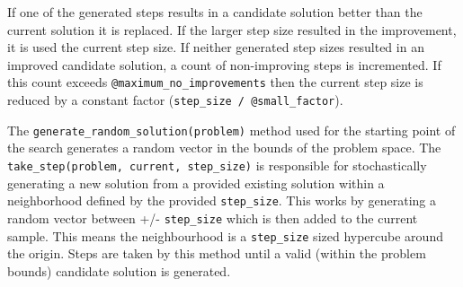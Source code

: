 If one of the generated steps results in a candidate solution better than the current solution it is replaced. If the larger step size resulted in the improvement, it is used the current step size. If neither generated step sizes resulted in an improved candidate solution, a count of non-improving steps is incremented. If this count exceeds \texttt{@maximum\_no\_improvements} then the current step size is reduced by a constant factor (\texttt{step\_size / @small\_factor}).

The \texttt{generate\_random\_solution(problem)} method used for the starting point of the search generates a random vector in the bounds of the problem space. The \texttt{take\_step(problem, current, step\_size)} is responsible for stochastically generating a new solution from a provided existing solution within a neighborhood defined by the provided \texttt{step\_size}. This works by generating a random vector between +/- \texttt{step\_size} which is then added to the current sample. This means the neighbourhood is a \texttt{step\_size} sized hypercube around the origin. Steps are taken by this method until a valid (within the problem bounds) candidate solution is generated.

